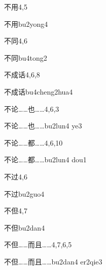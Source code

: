 \begin{entry}{不用}{4,5}
  \begin{phonetics}{不用}{bu2yong4}
  \end{phonetics}
\end{entry}

\begin{entry}{不同}{4,6}
  \begin{phonetics}{不同}{bu4tong2}
  \end{phonetics}
\end{entry}

\begin{entry}{不成话}{4,6,8}
  \begin{phonetics}{不成话}{bu4cheng2hua4}
  \end{phonetics}
\end{entry}

\begin{entry}{不论……也……}{4,6,3}
  \begin{phonetics}{不论……也……}{bu2lun4 ye3}
  \end{phonetics}
\end{entry}

\begin{entry}{不论……都……}{4,6,10}
  \begin{phonetics}{不论……都……}{bu2lun4 dou1}
  \end{phonetics}
\end{entry}

\begin{entry}{不过}{4,6}
  \begin{phonetics}{不过}{bu2guo4}
  \end{phonetics}
\end{entry}

\begin{entry}{不但}{4,7}
  \begin{phonetics}{不但}{bu2dan4}
  \end{phonetics}
\end{entry}

\begin{entry}{不但……而且……}{4,7,6,5}
  \begin{phonetics}{不但……而且……}{bu2dan4 er2qie3}
  \end{phonetics}
\end{entry}

